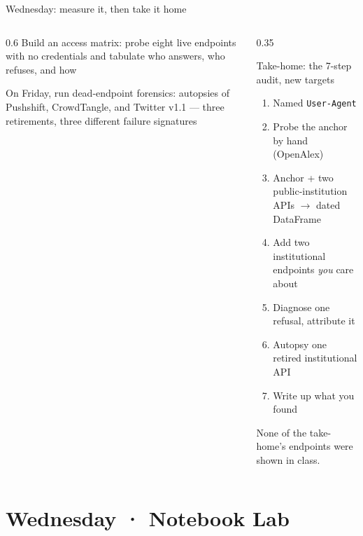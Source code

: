 \documentclass[9pt,aspectratio=169]{beamer}
\begin{document}
\begin{frame}{Wednesday: measure it, then take it home}
    \begin{columns}[T]
        \begin{column}{0.6\textwidth}
            Build an access matrix: probe eight live endpoints with no credentials and tabulate who answers, who refuses, and how
            
            \medskip
            
            On Friday, run dead-endpoint forensics: autopsies of Pushshift, CrowdTangle, and Twitter v1.1 --- three retirements, three different failure signatures
        \end{column}
        \begin{column}{0.35\textwidth}
            \begin{alertblock}{Take-home: the 7-step audit, new targets}
                \footnotesize
                \begin{enumerate}\footnotesize
                    \item Named \texttt{User-Agent}
                    \item Probe the anchor by hand (OpenAlex)
                    \item Anchor + two public-institution APIs $\rightarrow$ dated DataFrame
                    \item Add two institutional endpoints \textit{you} care about
                    \item Diagnose one refusal, attribute it
                    \item Autopsy one retired institutional API
                    \item Write up what you found
                \end{enumerate}
                None of the take-home's endpoints were shown in class.
            \end{alertblock}
        \end{column}
    \end{columns}
\end{frame}

\section{Wednesday · Notebook Lab}
\end{document}
